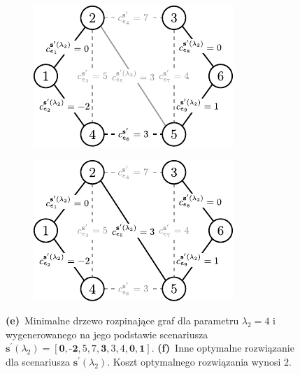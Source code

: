 \begin{figure}[!htbp]
	\ContinuedFloat
	\null\hfill
	\begin{subfigure}[b]{0.32\textwidth}
		\includegraphics[width=\textwidth]{Chapter_IV/INC-MST-example/d1}
		\caption{}
		\label{fig:imstExample:e}
	\end{subfigure}
	\hfill
	\begin{subfigure}[b]{0.32\textwidth}
		\includegraphics[width=\textwidth]{Chapter_IV/INC-MST-example/d2}
		\caption{}
		\label{fig:imstExample:f}
	\end{subfigure}
	\hfill\null
	\caption{
		\textbf{(e)}~Minimalne drzewo rozpinające graf dla parametru $\lambda_{2} = 4$ i wygenerowanego na jego podstawie scenariusza $\textbf{s}^{\prime} \left( \lambda_{2} \right) = \left[ \textbf{0}, \textbf{-2}, 5, 7, \textbf{3}, 3, 4, \textbf{0}, \textbf{1} \right]$.
		\textbf{(f)}~Inne optymalne rozwiązanie dla scenariusza $\textbf{s}^{\prime} \left( \lambda_{2} \right)$. Koszt optymalnego rozwiązania wynosi $2$.
	}
	\label{fig:imstExample}
\end{figure}


